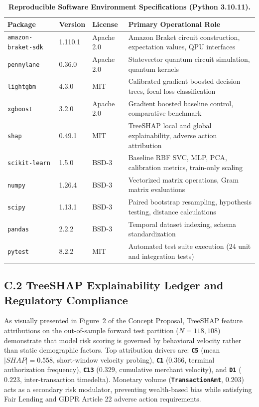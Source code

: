 \documentclass[10pt,a4paper]{article}
\begin{document}
\vspace{-2pt}
\begin{table}[h!]
\centering
\renewcommand{\arraystretch}{0.68}
\caption{\textbf{Reproducible Software Environment Specifications (Python 3.10.11).}}
\label{tab:env}
\vspace{1pt}
\begin{tabularx}{\linewidth}{@{}lllX@{}}
\toprule
\textbf{Package} & \textbf{Version} & \textbf{License} & \textbf{Primary Operational Role} \\
\midrule
\texttt{amazon-braket-sdk} & 1.110.1 & Apache 2.0 & Amazon Braket circuit construction, expectation values, QPU interfaces \\
\texttt{pennylane} & 0.36.0 & Apache 2.0 & Statevector quantum circuit simulation, quantum kernels \\
\texttt{lightgbm} & 4.3.0 & MIT & Calibrated gradient boosted decision trees, focal loss classification \\
\texttt{xgboost} & 3.2.0 & Apache 2.0 & Gradient boosted baseline control, comparative benchmark \\
\texttt{shap} & 0.49.1 & MIT & TreeSHAP local and global explainability, adverse action attribution \\
\texttt{scikit-learn} & 1.5.0 & BSD-3 & Baseline RBF SVC, MLP, PCA, calibration metrics, train-only scaling \\
\texttt{numpy} & 1.26.4 & BSD-3 & Vectorized matrix operations, Gram matrix evaluations \\
\texttt{scipy} & 1.13.1 & BSD-3 & Paired bootstrap resampling, hypothesis testing, distance calculations \\
\texttt{pandas} & 2.2.2 & BSD-3 & Temporal dataset indexing, schema standardization \\
\texttt{pytest} & 8.2.2 & MIT & Automated test suite execution (24 unit and integration tests) \\
\bottomrule
\end{tabularx}
\end{table}
\vspace{-8pt}

\subsection*{C.2 TreeSHAP Explainability Ledger and Regulatory Compliance}
As visually presented in Figure~2 of the Concept Proposal, TreeSHAP feature attributions on the out-of-sample forward test partition ($N=118,108$) demonstrate that model risk scoring is governed by behavioral velocity rather than static demographic factors. Top attribution drivers are: \textbf{\texttt{C5}} (mean $|SHAP|=0.558$, short-window velocity probing), \textbf{\texttt{C1}} ($0.366$, terminal authorization frequency), \textbf{\texttt{C13}} ($0.329$, cumulative merchant velocity), and \textbf{\texttt{D1}} ($0.223$, inter-transaction timedelta). Monetary volume (\textbf{\texttt{TransactionAmt}}, $0.203$) acts as a secondary risk modulator, preventing wealth-based bias while satisfying Fair Lending and GDPR Article 22 adverse action requirements.
\end{document}
